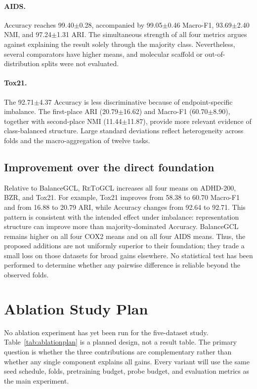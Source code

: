 \documentclass[10pt,twocolumn]{article}
\newcommand{\method}{\textsc{ReToGCL}}
\begin{document}
\paragraph{AIDS.}
Accuracy reaches 99.40$\pm$0.28, accompanied by 99.05$\pm$0.46 Macro-F1, 93.69$\pm$2.40 NMI, and 97.24$\pm$1.31 ARI. The simultaneous strength of all four metrics argues against explaining the result solely through the majority class. Nevertheless, several comparators have higher means, and molecular scaffold or out-of-distribution splits were not evaluated.

\paragraph{Tox21.}
The 92.71$\pm$4.37 Accuracy is less discriminative because of endpoint-specific imbalance. The first-place ARI (20.79$\pm$16.62) and Macro-F1 (60.70$\pm$8.90), together with second-place NMI (11.44$\pm$11.87), provide more relevant evidence of class-balanced structure. Large standard deviations reflect heterogeneity across folds and the macro-aggregation of twelve tasks.

\subsection{Improvement over the direct foundation}

Relative to BalanceGCL, \method{} increases all four means on ADHD-200, BZR, and Tox21. For example, Tox21 improves from 58.38 to 60.70 Macro-F1 and from 16.88 to 20.79 ARI, while Accuracy changes from 92.64 to 92.71. This pattern is consistent with the intended effect under imbalance: representation structure can improve more than majority-dominated Accuracy. BalanceGCL remains higher on all four COX2 means and on all four AIDS means. Thus, the proposed additions are not uniformly superior to their foundation; they trade a small loss on those datasets for broad gains elsewhere. No statistical test has been performed to determine whether any pairwise difference is reliable beyond the observed folds.

\section{Ablation Study Plan}
\label{sec:ablation}

No ablation experiment has yet been run for the five-dataset study. Table~\ref{tab:ablationplan} is a planned design, not a result table. The primary question is whether the three contributions are complementary rather than whether any single component explains all gains. Every variant will use the same seed schedule, folds, pretraining budget, probe budget, and evaluation metrics as the main experiment.
\end{document}
